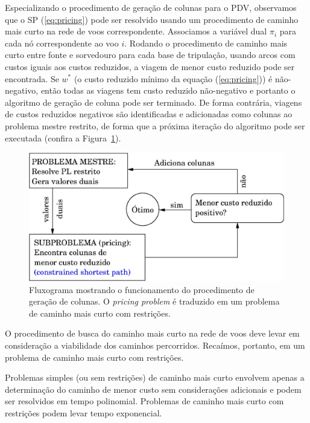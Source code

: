 Especializando o procedimento de geração de colunas para o PDV, observamos que o SP
(\ref{eq:pricing}) pode ser resolvido usando um procedimento de caminho mais curto na rede de voos
correspondente. Associamos a variável dual $\pi_i$ para cada nó correspondente ao voo $i$. Rodando o
procedimento de caminho mais curto entre fonte e sorvedouro para cada base de tripulação, usando
arcos com custos iguais aos custos reduzidos, a viagem de menor custo reduzido pode ser encontrada.
Se $w^\ast$ (o custo reduzido mínimo da equação (\ref{eq:pricing})) é não-negativo, então todas as
viagens tem custo reduzido não-negativo e portanto o algoritmo de geração de coluna pode ser
terminado. De forma contrária, viagens de custos reduzidos negativos são identificadas e adicionadas
como colunas ao problema mestre restrito, de forma que a próxima iteração do algoritmo pode ser
executada (confira a Figura~\ref{fig:cg}).

\begin{figure}[htbp]
	\begin{center}
		\includegraphics[scale=0.6]{fig/cg.eps}
		\caption{Fluxograma mostrando o funcionamento do procedimento de geração de colunas.
		O {\it pricing problem} é traduzido em um problema de caminho mais curto com
restrições.}
		\label{fig:cg}
	\end{center}
\end{figure}

O procedimento de busca do caminho mais curto na rede de voos deve levar em consideração a 
viabilidade dos caminhos percorridos. Recaímos, portanto, em um problema de caminho mais curto
com restrições.

Problemas simples (ou sem restrições) de caminho mais curto envolvem apenas a determinação do 
caminho de menor custo sem considerações adicionais e podem ser resolvidos em tempo polinomial. 
Problemas de caminho mais curto com restrições podem levar tempo exponencial.

